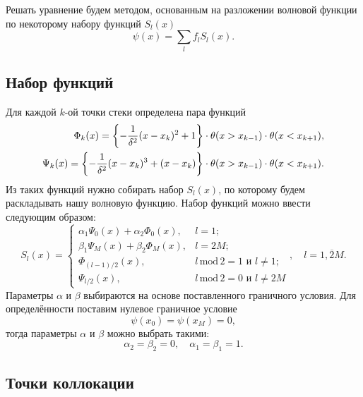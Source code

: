 \documentclass[10pt]{article}
\begin{document}
Решать уравнение будем методом, основанным на разложении волновой функции по некоторому набору функций $S_l(x)$
\begin{equation}
    \psi(x) = \sum\limits_{l} f_l S_l(x).
    \label{eq:decomp}
\end{equation}

\subsection{Набор функций}

Для каждой $k$-ой точки стеки определена пара функций
\begin{equation}
    \begin{split}
        \Phi_{k}(x) = \qty{-\dfrac{1}{\delta^2}(x-x_k)^2 + 1}\cdot \theta(x>x_{k-1}) \cdot \theta(x<x_{k+1}),\\
        \Psi_{k}(x) = \qty{- \dfrac{1}{\delta^2}(x-x_k)^3 + (x-x_k)} \cdot \theta(x>x_{k-1}) \cdot \theta(x<x_{k+1}).\\
    \end{split}
\end{equation}
Из таких функций нужно собирать набор $S_l(x)$, по которому будем раскладывать нашу волновую функцию. Набор функций можно ввести следующим образом:
\begin{equation}
    S_l(x) =
    \begin{cases}
        \alpha_1 \Psi_0(x) + \alpha_2 \Phi_0(x), &l=1;\\
        \beta_1 \Psi_M(x) + \beta_2 \Phi_M(x), &l=2M;\\
         \Phi_{(l-1)/2}(x), &{l\,\textrm{mod}\,2 = 1\textrm{ и }l\ne 1};\\
        \Psi_{l/2}(x), &{l\,\textrm{mod}\,2 = 0\textrm{ и }l\ne 2M}
    \end{cases}
    ,\quad l = \overline{1, 2M}.
\end{equation}
Параметры $\alpha$ и $\beta$ выбираются на основе поставленного граничного условия. Для определённости поставим нулевое граничное условие
\begin{equation}
    \psi(x_0) = \psi(x_M) = 0,
\end{equation}
тогда параметры $\alpha$ и $\beta$ можно выбрать такими:
\begin{equation}
    \alpha_2=\beta_2=0,\quad \alpha_1=\beta_1=1.
\end{equation}

\subsection{Точки коллокации}
\end{document}

